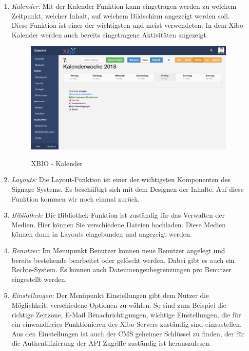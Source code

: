 \begin{enumerate}
	\item {\em Kalender:} Mit der Kalender Funktion kann eingetragen werden zu welchem Zeitpunkt, welcher Inhalt, auf welchem Bildschirm angezeigt werden soll. Diese Funktion ist einer der wichtigsten und meist verwendeten. In dem Xibo-Kalender werden auch bereits eingetragene Aktivitäten angezeigt.

\begin{figure}[H]
	\centering
\includegraphics[width=1\textwidth]{images/xibo-basics-calendar.png}
	\label{img:calendar}
	\caption{XBIO - Kalender}
\end{figure}	
	
	\item {\em Layouts:} 
	Die Layout-Funktion ist einer der wichtigsten Komponenten des Signage Systems. Es beschäftigt sich mit dem Designen der Inhalte. Auf diese Funktion kommen wir noch einmal zurück.
	
	\item {\em Bibliothek:} 
	Die Bibliothek-Funktion ist zuständig für das Verwalten der Medien. Hier können Sie verschiedene Dateien hochladen.  Diese Medien können dann in Layouts eingebunden und angezeigt werden.
	
	\item {\em Benutzer:} 
	Im Menüpunkt Benutzer können neue Benutzer angelegt und bereits bestehende bearbeitet oder gelöscht werden. Dabei gibt es auch ein Rechte-System. Es können auch Datenmengenbegrenzungen pro Benutzer eingestellt werden.
	
	\item {\em Einstellungen:} 
	Der Menüpunkt Einstellungen gibt dem Nutzer die Möglichkeit, verschiedene Optionen zu wählen. So sind zum Beispiel die richtige Zeitzone, E-Mail Benachrichtigungen, wichtige Einstellungen, die für ein einwandfreies Funktionieren des Xibo-Servers zuständig sind einzustellen. Aus den Einstellungen ist auch der CMS geheimer Schlüssel zu finden, der für die Authentifizierung der API Zugriffe zuständig ist herauszulesen.
\end{enumerate}

